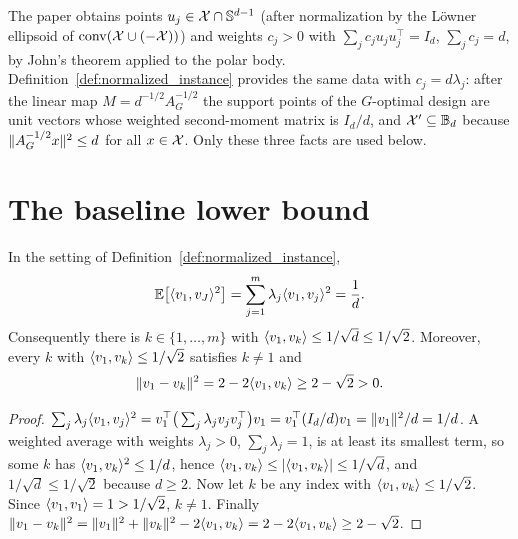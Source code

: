 \begin{remark}\label{rem:lower_adaptive_john}
The paper obtains points $u_j \in \mathcal{X}\cap\mathbb{S}^{d-1}$ (after normalization by the L\"owner
ellipsoid of $\operatorname{conv}(\mathcal{X}\cup(-\mathcal{X}))$) and weights $c_j > 0$ with $\sum_j c_j u_ju_j^\top = I_d$,
$\sum_j c_j = d$, by John's theorem applied to the polar body. Definition~\ref{def:normalized_instance}
provides the same data with $c_j = d\lambda_j$: after the linear map $M = d^{-1/2}A_G^{-1/2}$
the support points of the $G$-optimal design are unit vectors whose weighted second-moment
matrix is $I_d/d$, and $\mathcal{X}' \subseteq \mathbb{B}_d$ because $\lVert A_G^{-1/2}x \rVert^2 \le d$ for
all $x \in \mathcal{X}$. Only these three facts are used below.
\end{remark}

\section{The baseline lower bound}
\label{sec:lower_adaptive_baseline}

\begin{lemma}\label{lem:separated_pair}
\leanok
{}
In the setting of Definition~\ref{def:normalized_instance},
\[
  \mathbb{E}\big[\langle v_1, v_J \rangle^2\big] = \sum_{j=1}^m \lambda_j \langle v_1, v_j \rangle^2 = \frac1d .
\]
Consequently there is $k \in \{1,\dots,m\}$ with $\langle v_1, v_k \rangle \le 1/\sqrt d \le 1/\sqrt2$.
Moreover, every $k$ with $\langle v_1, v_k \rangle \le 1/\sqrt2$ satisfies $k \ne 1$ and
\[
  \lVert v_1 - v_k \rVert^2 = 2 - 2\langle v_1, v_k \rangle \ge 2 - \sqrt2 > 0 .
\]
\end{lemma}

\begin{proof}
\leanok
{}
$\sum_j\lambda_j\langle v_1, v_j \rangle^2 = v_1^\top\big(\sum_j\lambda_jv_jv_j^\top\big)v_1
= v_1^\top (I_d/d) v_1 = \lVert v_1 \rVert^2/d = 1/d$. A weighted average with weights
$\lambda_j > 0$, $\sum_j\lambda_j = 1$, is at least its smallest term, so some $k$ has
$\langle v_1, v_k \rangle^2 \le 1/d$, hence $\langle v_1, v_k \rangle \le \lvert \langle v_1, v_k \rangle \rvert \le 1/\sqrt d$, and
$1/\sqrt d \le 1/\sqrt2$ because $d \ge 2$. Now let $k$ be any index with
$\langle v_1, v_k \rangle \le 1/\sqrt2$. Since $\langle v_1, v_1 \rangle = 1 > 1/\sqrt2$, $k \ne 1$.
Finally $\lVert v_1 - v_k \rVert^2 = \lVert v_1 \rVert^2 + \lVert v_k \rVert^2 - 2\langle v_1, v_k \rangle = 2 - 2\langle v_1, v_k \rangle
\ge 2 - \sqrt2$.
\end{proof}

